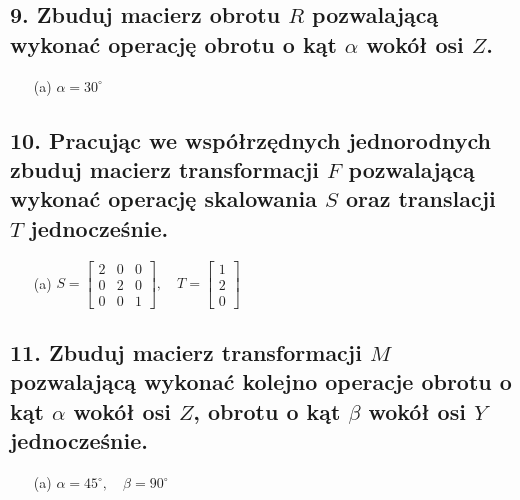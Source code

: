 \subsection*{9. Zbuduj macierz obrotu \( R \) pozwalającą wykonać operację obrotu o kąt \( \alpha \) wokół osi \( Z \).}

\begin{enumerate}
    \item[(a)] \( \alpha = 30^\circ \)
\end{enumerate}

\subsection*{10. Pracując we współrzędnych jednorodnych zbuduj macierz transformacji \( F \) pozwalającą wykonać operację skalowania \( S \) oraz translacji \( T \) jednocześnie.}

\begin{enumerate}
    \item[(a)] \( S = \begin{bmatrix} 2 & 0 & 0 \\ 0 & 2 & 0 \\ 0 & 0 & 1 \end{bmatrix}, \quad
    T = \begin{bmatrix} 1 \\ 2 \\ 0 \end{bmatrix} \)
\end{enumerate}

\subsection*{11. Zbuduj macierz transformacji \( M \) pozwalającą wykonać kolejno operacje obrotu o kąt \( \alpha \) wokół osi \( Z \), obrotu o kąt \( \beta \) wokół osi \( Y \) jednocześnie.}

\begin{enumerate}
    \item[(a)] \( \alpha = 45^\circ, \quad \beta = 90^\circ \)
\end{enumerate}